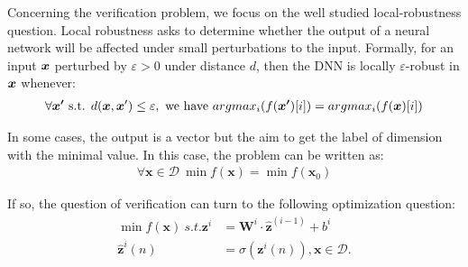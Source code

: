 \documentclass{article} %
\theoremstyle{definition}
\begin{document}
\iffalse
and the $i$-th hidden layer is a vector in $\mathbb{R}^{d_i}$, 
and the output layer is a vector in $\mathbb{R}^{d'}$ or a scale. 
The weights, bias and activation functions decide propagate the from previous to the next layer. In formula, from layer $l_{i-1}$ to layer $l_{i}$, the weight 
$\boldsymbol{W}^i$ is matrix of $d_i\times d_{i-1}$, 
the bias is a vector $\vb^i$ in $\mathbb{R}^{d_i}$, and the activation function 
is $\sigma$, then  if the $i-1$-th layer is $\hat{\boldsymbol{z}}^{(i-1)}$, 
then the value of $i$-th layer is computed by: 
\begin{align*}
	{\boldsymbol{z}}^{i} &= \boldsymbol{W}^i\cdot \hat{\boldsymbol{z}}^{(i-1)}+ \vb^i\\
	\hat{\boldsymbol{z}}^{i}(n) &= \sigma({\boldsymbol{z}}^i(n)).
\end{align*} The vector $\hat{\boldsymbol{z}}$ is called post-activation values, and $\boldsymbol{z}$ is called pre-activation values, and $\boldsymbol{z}^{(i)}_j$ is used to call the $j$-th neuron in the $i$-th layer. In our style, we also call neurons \emph{nodes} and use $a,b,c,d$ to denote them. We use $W_{ab}$ to denote the weight from neuron $b$ to $a$. We use $\boldsymbol{x}$ to denote the vector of input and  $f(\boldsymbol{x})$ to denote the output.
\fi

\medskip

Concerning the verification problem, we focus on the well studied local-robustness question. Local robustness asks to determine whether the output of a neural network will be affected under small perturbations to the input. 
Formally, for an input ${\bm{x}}$ perturbed by $\varepsilon >0$ under distance $d$, then the DNN is locally $\varepsilon$-robust in ${\bm{x}}$ whenever:
\begin{align*}
	\forall \boldsymbol{x'} \text{ s.t. } d({\bm{x}},{\bm{x}}')\leq \varepsilon, \text{ we have }  
	argmax_i (f(\boldsymbol{x'})[i]) = argmax_i(f(\boldsymbol{x})[i])
\end{align*} 

\iffalse
In some cases, the output is a vector but the aim to get the label of dimension with the minimal value. In this case, the problem can be written as:\begin{align*}
	\forall \boldsymbol{x} \in\mathcal{D} \  \min f(\boldsymbol{x}) = \min f(\boldsymbol{x}_0)
\end{align*}

If so, the question of verification can turn to the following optimization question: \begin{align*}
	\min f(\boldsymbol{x}) \ s.t. {\boldsymbol{z}}^{i} &= \boldsymbol{W}^i\cdot \hat{\boldsymbol{z}}^{(i-1)}+ b^i\\
	\hat{\boldsymbol{z}}^{i}(n) &= \sigma({\boldsymbol{z}}^i(n)), \boldsymbol{x}\in\mathcal{D}.
\end{align*}
\end{document}
